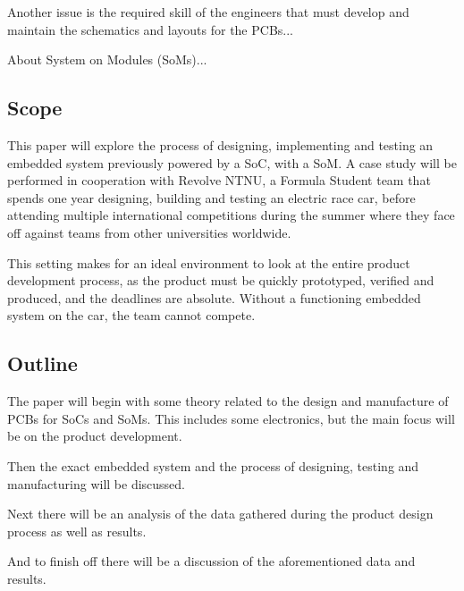 Another issue is the required skill of the engineers that must develop and maintain the schematics and layouts for the PCBs...

About System on Modules (SoMs)...

\subsection{Scope}

This paper will explore the process of designing, implementing and testing an embedded system previously powered by a SoC, with a SoM. A case study will be performed in cooperation with Revolve NTNU, a Formula Student team that spends one year designing, building and testing an electric race car, before attending multiple international competitions during the summer where they face off against teams from other universities worldwide.

This setting makes for an ideal environment to look at the entire product development process, as the product must be quickly prototyped, verified and produced, and the deadlines are absolute. Without a functioning embedded system on the car, the team cannot compete.


\subsection{Outline}

The paper will begin with some theory related to the design and manufacture of PCBs for SoCs and SoMs. This includes some electronics, but the main focus will be on the product development.

Then the exact embedded system and the process of designing, testing and manufacturing will be discussed.

Next there will be an analysis of the data gathered during the product design  process as well as results. 

And to finish off there will be a discussion of the aforementioned data and results.